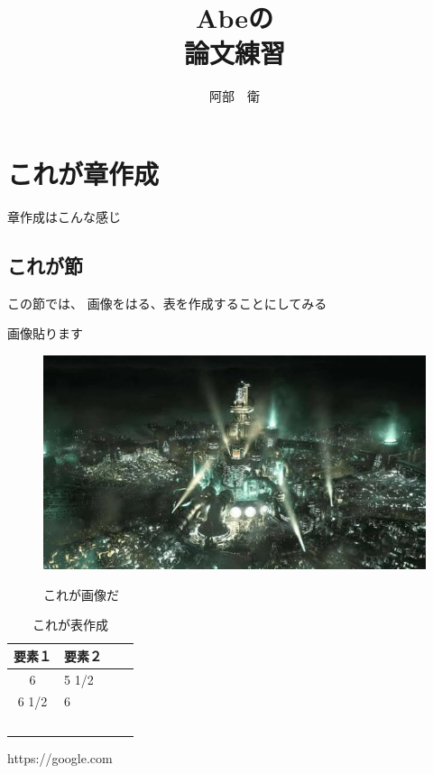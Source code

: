 \documentclass[dvipdfmx]{jsarticle}
\begin{document}
\title{Abeの\\論文練習}
\author{阿部　衛}
\maketitle{\title}
\thispagestyle{empty}
\newpage 


\section{これが章作成}
章作成はこんな感じ
\subsection{これが節}
この節では、
画像をはる、表を作成することにしてみる

画像貼ります
\begin{figure}[h]
   \begin{center}
     \caption{これが画像だ}
     \includegraphics[scale=0.1]{FF7R_zoom.jpg}
　\end{center}
\end{figure}



\begin{table}[h]
 \caption{これが表作成}
 \label{table:SpeedOfLight}
 \centering
  \begin{tabular}{clll}
   \hline
   要素１ & 要素２ \\
   \hline \hline
   6 & 5 1/2  \\
   6 1/2 & 6　\\    
　\hline
\end{tabular}
\end{table}


\newpage 
\begin{thebibliography}{99}
\item
  https://google.com 
\end{thebibliography}
\end{document}
